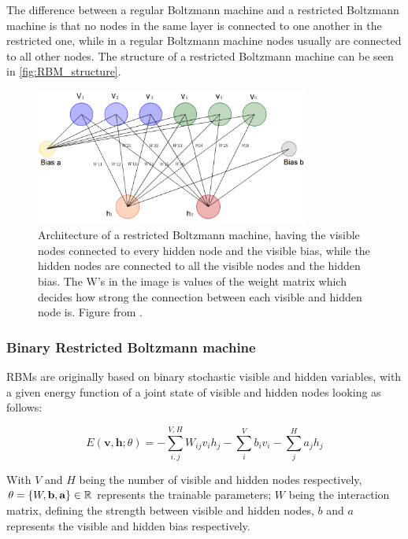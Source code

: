 \documentclass[../main.tex]{subfiles}
\begin{document}
The difference between a regular Boltzmann machine and a restricted Boltzmann machine is that no nodes in the same layer is connected to one another in the restricted one, while in a regular Boltzmann machine nodes usually are connected to all other nodes\cite{BM_book}. The structure of a restricted Boltzmann machine can be seen in \autoref{fig:RBM_structure}.

\begin{figure}[h]
    \centering
    \includegraphics[width=0.8\textwidth]{figures/boltzmann_machine_restricted.png}
    \caption{Architecture of a restricted Boltzmann machine, having the visible nodes connected to every hidden node and the visible bias, while the hidden nodes are connected to all the visible nodes and the hidden bias. The W's in the image is values of the weight matrix which decides how strong the connection between each visible and hidden node is. Figure from \cite{fig_RBM}.}
    \label{fig:RBM_structure}
\end{figure}

\subsubsection{Binary Restricted Boltzmann machine}
RBMs are originally based on binary stochastic visible and hidden variables, with a given energy function of a joint state of visible and hidden nodes looking as follows:

\begin{equation}
E(\mathbf{v}, \mathbf{h}; \theta) =-\sum_{i,j}^{V,H} W_{i j} v_{i} h_{j}-\sum_{i}^V b_{i} v_{i}-\sum_{j}^H a_{j} h_{j}
\label{eq:energfunkeruu}
\end{equation}

With $V$ and $H$ being the number of visible and hidden nodes respectively, $\theta=\{W, \mathbf{b}, \mathbf{a}\}\in\mathbb{R}$ represents the trainable parameters; $W$ being the interaction matrix, defining the strength between visible and hidden nodes, $b$ and $a$ represents the visible and hidden bias respectively. 
\end{document}
